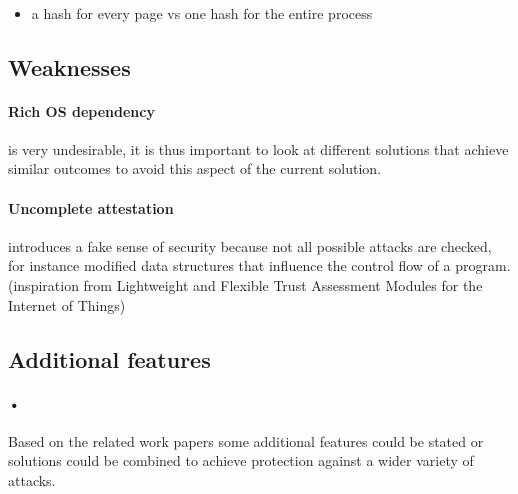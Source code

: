 \documentclass{report}
\begin{document}
\paragraph*{}
\begin{itemize}
\item a hash for every page vs one hash for the entire process
\end{itemize}

\subsection*{Weaknesses}

\paragraph*{Rich OS dependency}
is very undesirable, it is thus important to look at different solutions that achieve similar outcomes to avoid this aspect of the current solution.

\paragraph*{Uncomplete attestation}
introduces a fake sense of security because not all possible attacks are checked, for instance modified data structures that influence the control flow of a program. (inspiration from Lightweight and Flexible Trust Assessment Modules for the Internet of Things)

\subsection*{Additional features}

\paragraph*{•}
Based on the related work papers some additional features could be stated or solutions could be combined to achieve protection against a wider variety of attacks.
\end{document}
